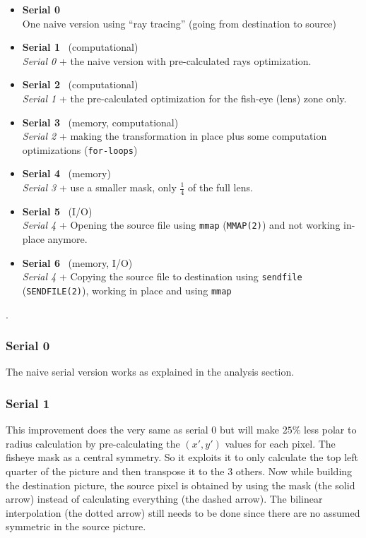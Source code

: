\documentclass[10pt,a4paper]{article}
\begin{document}
\begin{itemize}
    \item \textbf{Serial 0}\\
    One naive version using ``ray tracing'' (going from destination to source)

    \item \textbf{Serial 1} ~(computational)\\
    \emph{Serial 0} + the naive version with pre-calculated rays optimization.

    \item \textbf{Serial 2} ~(computational)\\
    \emph{Serial 1} + the pre-calculated optimization for the fish-eye (lens)
    zone only.

    \item \textbf{Serial 3} ~(memory, computational)\\
    \emph{Serial 2} + making the transformation in place plus some
    computation optimizations (\verb|for-loops|)

    \item \textbf{Serial 4} ~(memory)\\
    \emph{Serial 3} + use a smaller mask, only $\frac{1}{4}$ of the full lens.

    \item \textbf{Serial 5} ~(I/O)\\
    \emph{Serial 4} + Opening the source file using \texttt{mmap}
    (\verb|MMAP(2)|) and not working in-place anymore.

    \item \textbf{Serial 6} ~(memory, I/O)\\
    \emph{Serial 4} + Copying the source file to destination using
    \texttt{sendfile} (\verb|SENDFILE(2)|), working in place and using
    \texttt{mmap}

\end{itemize}.

\subsubsection{Serial 0}

The naive serial version works as explained in the analysis section.

\subsubsection{Serial 1}

This improvement does the very same as serial 0 but will make $25\%$ less polar
to radius calculation by pre-calculating the $(x\prime,y\prime)$ values for
each pixel. The fisheye mask as a central symmetry. So it exploits it to only
calculate the top left quarter of the picture and then transpose it to the $3$
others. Now while building the destination picture, the source pixel is
obtained by using the mask (the solid arrow) instead of calculating everything
(the dashed arrow).  The bilinear interpolation (the dotted arrow) still needs
to be done since there are no assumed symmetric in the source picture.
\end{document}
